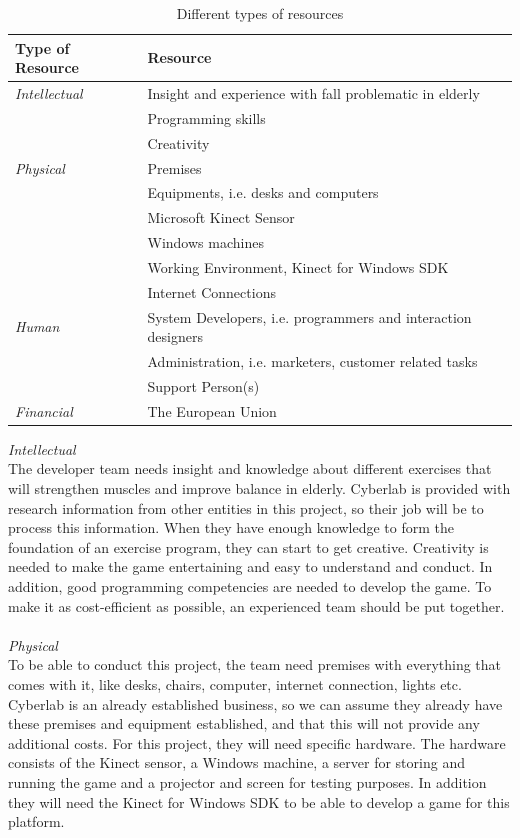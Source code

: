 \begin{table}
\centering
    \begin{tabular}{|l|l|}
        \hline
       \textbf{Type of Resource} & \textbf{Resource}  \\ \hline
       \emph{Intellectual} & Insight and experience with fall problematic in elderly \\ \cline{2-2}
        & Programming skills \\ \cline{2-2}
	 	& Creativity \\ \hline
	   \emph{Physical} & Premises \\ \cline{2-2}
	   	& Equipments, i.e. desks and computers  \\ \cline{2-2}
	   	& Microsoft Kinect Sensor \\ \cline{2-2}
	   	& Windows machines \\ \cline{2-2}
	   	& Working Environment, Kinect for Windows SDK \\ \cline{2-2}
	   	& Internet Connections \\ \hline
	   \emph{Human} & System Developers, i.e. programmers and interaction designers \\ \cline{2-2}
	   	& Administration, i.e. marketers, customer related tasks \\ \cline{2-2}
	   	& Support Person(s) \\ \hline
	   \emph{Financial} & The European Union \\
        \hline
    \end{tabular}
    \caption[Resources]{Different types of resources}
    \label{tab:Resources}
\end{table} 
\emph{Intellectual} \\ The developer team needs insight and knowledge about different exercises that will strengthen muscles and improve balance in elderly. Cyberlab is provided with research information from other entities in this project, so their job will be to process this information. When they have enough knowledge to form the foundation of an exercise program, they can start to get creative. Creativity is needed to make the game entertaining and easy to understand and conduct. In addition, good programming competencies are needed to develop the game. To make it as cost-efficient as possible, an experienced team should be put together. \\ \\
\emph{Physical} \\ To be able to conduct this project, the team need premises with everything that comes with it, like desks, chairs, computer, internet connection, lights etc. Cyberlab is an already established business, so we can assume they already have these premises and equipment established, and that this will not provide any additional costs. For this project, they will need specific hardware. The hardware consists of the Kinect sensor, a Windows machine, a server for storing and running the game and a projector and screen for testing purposes. In addition they will need the Kinect for Windows SDK to be able to develop a game for this platform.\\ \\
